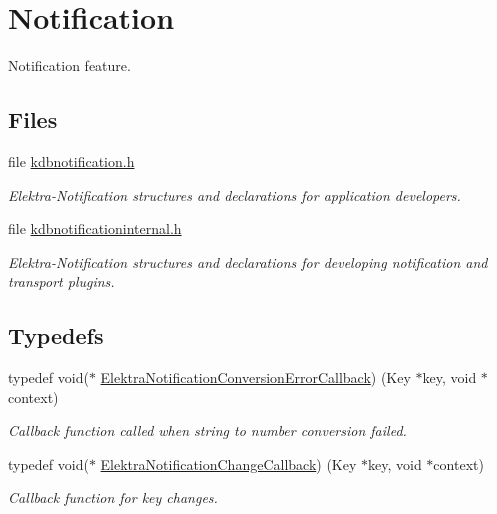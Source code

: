 \hypertarget{group__kdbnotification}{}\section{Notification}
\label{group__kdbnotification}


Notification feature.  


\subsection*{Files}
\begin{DoxyCompactItemize}
\item 
file \mbox{\hyperlink{kdbnotification_8h}{kdbnotification.\+h}}
\begin{DoxyCompactList}\small\item\em Elektra-\/\+Notification structures and declarations for application developers. \end{DoxyCompactList}\item 
file \mbox{\hyperlink{kdbnotificationinternal_8h}{kdbnotificationinternal.\+h}}
\begin{DoxyCompactList}\small\item\em Elektra-\/\+Notification structures and declarations for developing notification and transport plugins. \end{DoxyCompactList}\end{DoxyCompactItemize}
\subsection*{Typedefs}
\begin{DoxyCompactItemize}
\item 
typedef void($\ast$ \mbox{\hyperlink{group__kdbnotification_gaad19fb981cad906eb9c72bd602c7bb64}{Elektra\+Notification\+Conversion\+Error\+Callback}}) (Key $\ast$key, void $\ast$context)
\begin{DoxyCompactList}\small\item\em Callback function called when string to number conversion failed. \end{DoxyCompactList}\item 
typedef void($\ast$ \mbox{\hyperlink{group__kdbnotification_gad0d800e32a72d89780321e5723301eb9}{Elektra\+Notification\+Change\+Callback}}) (Key $\ast$key, void $\ast$context)
\begin{DoxyCompactList}\small\item\em Callback function for key changes. \end{DoxyCompactList}\end{DoxyCompactItemize}

